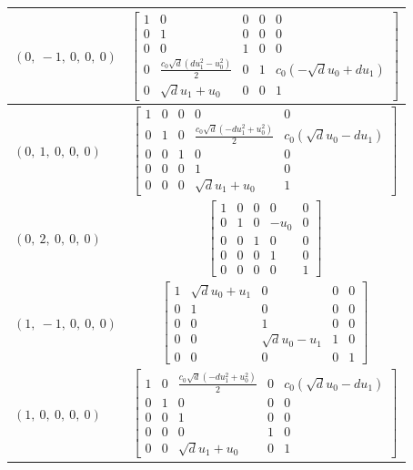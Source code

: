 \documentclass[11pt]{article}
\theoremstyle{definition}
\begin{document}
\begin{tabular}{|l|c|}
    \hline
    $\left( 0, \  -1, \  0, \  0, \  0\right)$ & $\left[\begin{matrix}1 & 0 & 0 & 0 & 0\\0 & 1 & 0 & 0 & 0\\0 & 0 & 1 & 0 & 0\\0 & \frac{c_{0} \sqrt{d} \left(d u_{1}^{2} - u_{0}^{2}\right)}{2} & 0 & 1 & c_{0} \left(- \sqrt{d} u_{0} + d u_{1}\right)\\0 & \sqrt{d} u_{1} + u_{0} & 0 & 0 & 1\end{matrix}\right]$ \\
    \hline
    $\left( 0, \  1, \  0, \  0, \  0\right)$ & $\left[\begin{matrix}1 & 0 & 0 & 0 & 0\\0 & 1 & 0 & \frac{c_{0} \sqrt{d} \left(- d u_{1}^{2} + u_{0}^{2}\right)}{2} & c_{0} \left(\sqrt{d} u_{0} - d u_{1}\right)\\0 & 0 & 1 & 0 & 0\\0 & 0 & 0 & 1 & 0\\0 & 0 & 0 & \sqrt{d} u_{1} + u_{0} & 1\end{matrix}\right]$ \\
    \hline
    $\left( 0, \  2, \  0, \  0, \  0\right)$ & $\left[\begin{matrix}1 & 0 & 0 & 0 & 0\\0 & 1 & 0 & - u_{0} & 0\\0 & 0 & 1 & 0 & 0\\0 & 0 & 0 & 1 & 0\\0 & 0 & 0 & 0 & 1\end{matrix}\right]$ \\
    \hline
    $\left( 1, \  -1, \  0, \  0, \  0\right)$ & $\left[\begin{matrix}1 & \sqrt{d} u_{0} + u_{1} & 0 & 0 & 0\\0 & 1 & 0 & 0 & 0\\0 & 0 & 1 & 0 & 0\\0 & 0 & \sqrt{d} u_{0} - u_{1} & 1 & 0\\0 & 0 & 0 & 0 & 1\end{matrix}\right]$ \\
    \hline
    $\left( 1, \  0, \  0, \  0, \  0\right)$ & $\left[\begin{matrix}1 & 0 & \frac{c_{0} \sqrt{d} \left(- d u_{1}^{2} + u_{0}^{2}\right)}{2} & 0 & c_{0} \left(\sqrt{d} u_{0} - d u_{1}\right)\\0 & 1 & 0 & 0 & 0\\0 & 0 & 1 & 0 & 0\\0 & 0 & 0 & 1 & 0\\0 & 0 & \sqrt{d} u_{1} + u_{0} & 0 & 1\end{matrix}\right]$ \\

\end{tabular}
\end{document}
